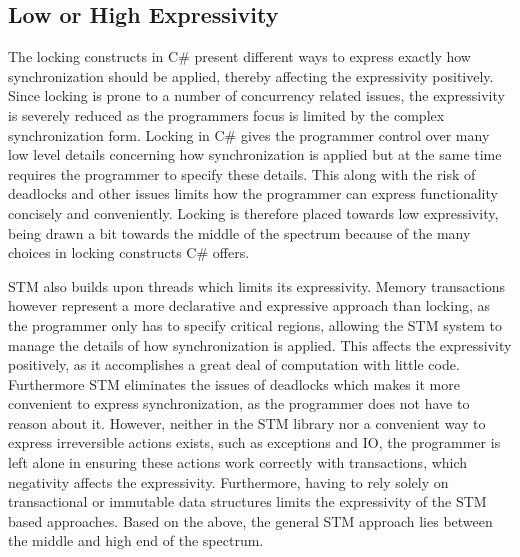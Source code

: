\subsection{Low or High Expressivity}\label{subsec:expressivity}
The locking constructs in C\# present different ways to express exactly how synchronization should be applied, thereby affecting the expressivity positively. Since locking is prone to a number of concurrency related issues, the expressivity is severely reduced as the programmers focus is limited by the complex synchronization form. Locking in C\# gives the programmer control over many low level details concerning how synchronization is applied but at the same time requires the programmer to specify these details. This along with the risk of deadlocks and other issues limits how the programmer can express functionality concisely and conveniently. Locking is therefore placed towards low expressivity, being drawn a bit towards the middle of the spectrum because of the many choices in locking constructs C\# offers.

\ac{STM} also builds upon threads which limits its expressivity. Memory transactions however represent a more declarative and expressive approach than locking, as the programmer only has to specify critical regions, allowing the \ac{STM} system to manage the details of how synchronization is applied. This affects the expressivity positively, as it accomplishes a great deal of computation with little code. Furthermore \ac{STM} eliminates the issues of deadlocks which makes it more convenient to express synchronization, as the programmer does not have to reason about it. However, neither in the \ac{STM} library nor \stmname a convenient way to express irreversible actions exists, such as exceptions and \ac{IO}, the programmer is left alone in ensuring these actions work correctly with transactions, which negativity affects the expressivity. Furthermore, having to rely solely on transactional or immutable data structures limits the expressivity of the \ac{STM} based approaches. Based on the above, the general \ac{STM} approach lies between the middle and high end of the spectrum.


